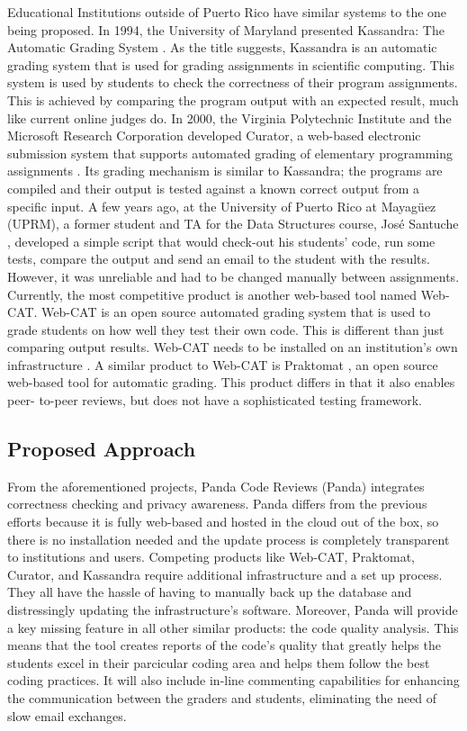 Educational Institutions outside of Puerto Rico have similar systems to the one
being proposed. In 1994, the University of Maryland presented Kassandra: The
Automatic Grading System \cite{Matt1994}. As the title suggests, Kassandra is an
automatic grading system that is used for grading assignments in scientific
computing. This system is used by students to check the correctness of their
program assignments. This is achieved by comparing the program output with an
expected result, much like current online judges do. In 2000, the Virginia
Polytechnic Institute and the Microsoft Research Corporation developed Curator,
a web-based electronic submission system that supports automated grading of
elementary programming assignments \cite{Curator}. Its grading mechanism is
similar to Kassandra; the programs are compiled and their output is tested
against a known correct output from a specific input. A few years ago, at the
University of Puerto Rico at Mayagüez (UPRM), a former student and TA for the
Data  Structures course, José Santuche \cite{Santuche}, developed a simple
script that would check-out his students' code, run some tests, compare the
output and send an email to the student with the results. However, it was
unreliable and had to be changed manually between assignments. Currently, the
most competitive product is another web-based tool named Web-CAT. Web-CAT is an
open source automated grading system that is used to grade students on how well
they test their own code. This is different than just comparing output results.
Web-CAT needs to be installed on an institution's own infrastructure
\cite{WebCat}. A similar product to Web-CAT is Praktomat \cite{Praktomat}, an
open source web-based tool for automatic grading. This product differs in that
it also enables peer- to-peer reviews, but does not have a sophisticated testing
framework. %

\subsection{Proposed Approach}

From the aforementioned projects, Panda Code Reviews (Panda) integrates
correctness checking and privacy awareness. Panda differs from the previous
efforts because it is fully web-based and hosted in the cloud out of the box, so
there is no installation needed and the update process is completely transparent
to institutions and users. Competing products like Web-CAT, Praktomat, Curator,
and Kassandra require additional infrastructure and a set up process.
They all have the hassle of having to manually back up the database and
distressingly updating the infrastructure's software. Moreover, Panda will provide a
key missing feature in all other similar products: the code quality analysis.
This means that the tool creates reports of the code's quality that greatly
helps the students excel in their parcicular coding area and helps them follow
the best coding practices. It will also include in-line commenting capabilities
for enhancing the communication between the graders and students, eliminating
the need of slow email exchanges.

